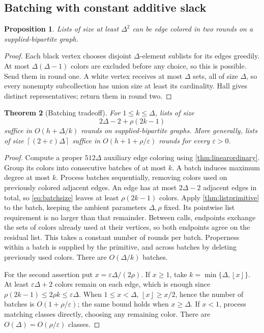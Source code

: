 \documentclass[11pt]{article}
\newtheorem{theorem}{Theorem}[section]
\newtheorem{proposition}[theorem]{Proposition}
\theoremstyle{definition}
\theoremstyle{remark}
\newcommand{\eps}{\varepsilon}
\newcommand{\ceil}[1]{\left\lceil #1\right\rceil}
\newcommand{\floor}[1]{\left\lfloor #1\right\rfloor}
\begin{document}
\subsection{Batching with constant additive slack}
\begin{proposition}\label{prop:quadraticlists}
Lists of size at least $\Delta^2$ can be edge colored in two rounds
on a supplied-bipartite graph.
\end{proposition}
\begin{proof}
Each black vertex chooses disjoint $\Delta$-element sublists for its
edges greedily. At most $\Delta(\Delta-1)$ colors are excluded before
any choice, so this is possible. Send them in round one. A white
vertex receives at most $\Delta$ sets, all of size $\Delta$, so every
nonempty subcollection has union size at least its cardinality.
Hall gives distinct representatives; return them in round two.
\end{proof}

\begin{theorem}[Batching tradeoff]\label{thm:batching}
For $1\le k\le\Delta$, lists of size
\begin{equation}\label{eq:batchsize}
 2\Delta-2+\rho(2k-1)
\end{equation}
suffice in $O(h+\Delta/k)$ rounds on supplied-bipartite graphs.
More generally, lists of size $\ceil{(2+\eps)\Delta}$ suffice in
$O(h+1+\rho/\eps)$ rounds for every $\eps>0$.
\end{theorem}
\begin{proof}
Compute a proper $512\Delta$ auxiliary edge coloring using
\cref{thm:linearordinary}. Group its colors into consecutive batches
of at most $k$. A batch induces maximum degree at most $k$.
Process batches sequentially, removing colors used on previously
colored adjacent edges. An edge has at most $2\Delta-2$ adjacent
edges in total, so \eqref{eq:batchsize} leaves at least
$\rho(2k-1)$ colors. Apply \cref{thm:listprimitive} to the batch,
keeping the ambient parameters $\Delta,\rho$ fixed.
Its pointwise list requirement is no larger than that remainder.
Between calls, endpoints exchange the sets of colors already used
at their vertices, so both endpoints agree on the residual list.
This takes a constant number of rounds per batch. Properness within
a batch is supplied by the primitive, and across batches by deleting
previously used colors. There are $O(\Delta/k)$ batches.

For the second assertion put $x=\eps\Delta/(2\rho)$. If $x\ge1$,
take $k=\min\{\Delta,\floor x\}$. At least $\eps\Delta+2$
colors remain on each edge, which is enough since
$\rho(2k-1)\le2\rho k\le\eps\Delta$.
When $1\le x<\Delta$, $\floor x\ge x/2$, hence the number of batches
is $O(1+\rho/\eps)$; the same bound holds when $x\ge\Delta$.
If $x<1$, process matching classes directly, choosing any remaining
color. There are $O(\Delta)=O(\rho/\eps)$ classes.
\end{proof}
\end{document}

